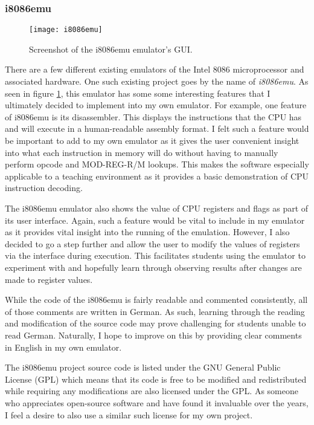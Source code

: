     \subsubsection{i8086emu}
        \begin{figure}[h]
            \centering
            \texttt{[image: i8086emu]}
            \caption{Screenshot of the i8086emu emulator's GUI.}
            \label{fig:i8086emu}
        \end{figure}

        There are a few different existing emulators of the Intel 8086 microprocessor and associated hardware. One such existing project goes by the name of \textit{i8086emu}. As seen in figure \ref{fig:i8086emu}, this emulator has some some interesting features that I ultimately decided to implement into my own emulator. For example, one feature of i8086emu is its disassembler. This displays the instructions that the CPU has and will execute in a human-readable assembly format. I felt such a feature would be important to add to my own emulator as it gives the user convenient insight into what each instruction in memory will do without having to manually perform opcode and MOD-REG-R/M lookups. This makes the software especially applicable to a teaching environment as it provides a basic demonstration of CPU instruction decoding.

        The i8086emu emulator also shows the value of CPU registers and flags as part of its user interface. Again, such a feature would be vital to include in my emulator as it provides vital insight into the running of the emulation. However, I also decided to go a step further and allow the user to modify the values of registers via the interface during execution. This facilitates students using the emulator to experiment with and hopefully learn through observing results after changes are made to register values.

        While the code of the i8086emu is fairly readable and commented consistently, all of those comments are written in German. As such, learning through the reading and modification of the source code may prove challenging for students unable to read German. Naturally, I hope to improve on this by providing clear comments in English in my own emulator.

        The i8086emu project source code is listed under the GNU General Public License (GPL) which means that its code is free to be modified and redistributed while requiring any modifications are also licensed under the GPL. As someone who appreciates open-source software and have found it invaluable over the years, I feel a desire to also use a similar such license for my own project.

